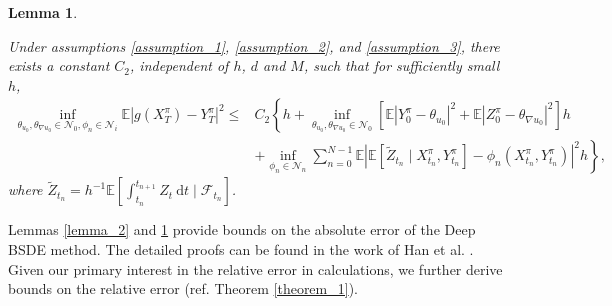\documentclass[11pt]{article}
\newtheorem{lemma}{Lemma}
\begin{document}
\begin{lemma}\label{lemma_3}

Under assumptions \ref{assumption_1}, \ref{assumption_2}, and \ref{assumption_3}, there exists a constant $C_2$, independent of $h$, $d$ and $M$, such that for sufficiently small $h$,
\begin{equation}\label{lemma3}
	\begin{aligned}
		\inf_{\theta_{{u_0}},\theta_{\nabla{u_0}} \in \mathcal{N}_0, \phi_n \in \mathcal{N}_i} \mathbb{E}\left|g\left(X_T^\pi\right)-Y_T^\pi\right|^2  
		\leq &C_2\left\{h+\inf _{\theta_{{u_0}},\theta_{\nabla{u_0}} \in \mathcal{N}_0}\left[ \mathbb{E}\left| Y_0^\pi-\theta_{{u_0}} \right|^2 +  \mathbb{E}\left| Z_0^\pi-\theta_{\nabla{u_0}} \right|^2  \right]h\right.\\
		&\left. + \inf _{\phi_n \in \mathcal{N}_n} \sum_{n=0}^{N-1} \mathbb{E}\left|\mathbb{E}\left[\tilde{Z}_{t_n} \mid X_{t_n}^\pi, Y_{t_n}^\pi\right]-\phi_n\left(X_{t_n}^\pi, Y_{t_n}^\pi\right)\right|^2 h\right\},
	\end{aligned}
\end{equation}	
where $\tilde{Z}_{t_n}=h^{-1}\mathbb{ E}\left[\int_{t_n}^{t_{n+1}} Z_t \mathrm{~d} t \mid \mathcal{F}_{t_n}\right]$. 
\end{lemma}

Lemmas \ref{lemma_2} and \ref{lemma_3} provide bounds on the absolute error of the Deep BSDE method. The detailed proofs can be found in the work of Han et al. \cite{Convergence-of-the-deep-BSDE-method}.
Given our primary interest in the relative error in calculations, we further derive bounds on the relative error (ref. Theorem \ref{theorem_1}).
\end{document}
